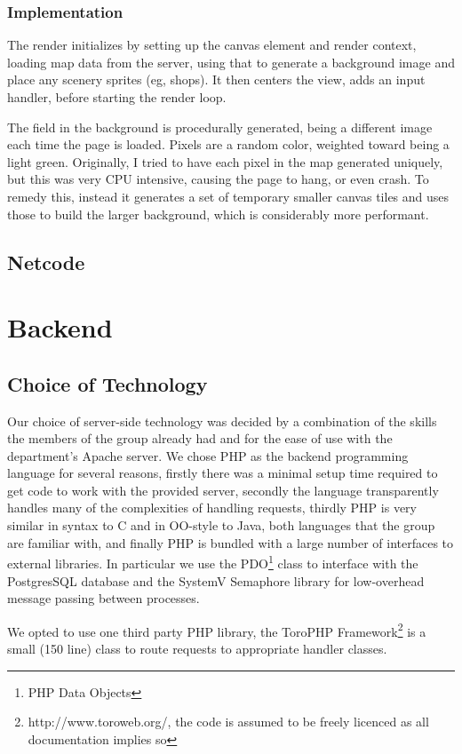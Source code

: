 \documentclass[12pt]{amsart}
\begin{document}
    \subsubsection{Implementation}
      \begin{flushleft}
        The render initializes by setting up the canvas element and render context, loading map data from the server, using that to generate a background image and place any scenery sprites (eg, shops). It then centers the view, adds an input handler, before starting the render loop.

        The field in the background is procedurally generated, being a different image each time the page is loaded. Pixels are a random color, weighted toward being a light green. Originally, I tried to have each pixel in the map generated uniquely, but this was very CPU intensive, causing the page to hang, or even crash. To remedy this, instead it generates a set of temporary smaller canvas tiles and uses those to build the larger background, which is considerably more performant.
      \end{flushleft}
  \subsection{Netcode}
    \begin{flushleft}
    \end{flushleft}
\section{Backend}
  \subsection{Choice of Technology}
    \begin{flushleft}
      Our choice of server-side technology was decided by a combination of the skills the members of the group already had and for the ease of use with the department's Apache server. We chose PHP as the backend programming language for several reasons, firstly there was a minimal setup time required to get code to work with the provided server, secondly the language transparently handles many of the complexities of handling requests, thirdly PHP is very similar in syntax to C and in OO-style to Java, both languages that the group are familiar with, and finally PHP is bundled with a large number of interfaces to external libraries.
In particular we use the PDO\footnote{PHP Data Objects} class to interface with the PostgresSQL database and the SystemV Semaphore library for low-overhead message passing between processes.

We opted to use one third party PHP library, the ToroPHP Framework\footnote{http://www.toroweb.org/, the code is assumed to be freely licenced as all documentation implies so} is a small (150 line) class to route requests to appropriate handler classes.
    \end{flushleft}
\end{document}
